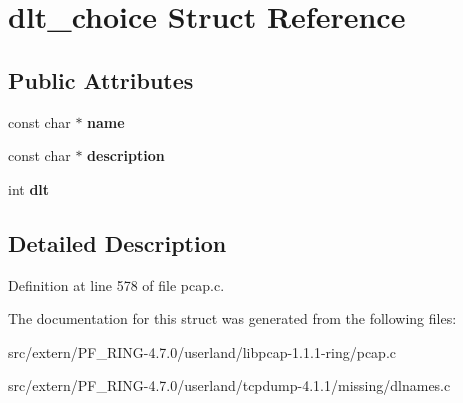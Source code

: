 \hypertarget{structdlt__choice}{
\section{dlt\_\-choice Struct Reference}
\label{structdlt__choice}
}
\subsection*{Public Attributes}
\begin{DoxyCompactItemize}
\item 
\hypertarget{structdlt__choice_a75f87984c116e0fb748b6d6a5bc42f71}{
const char $\ast$ {\bfseries name}}
\label{structdlt__choice_a75f87984c116e0fb748b6d6a5bc42f71}

\item 
\hypertarget{structdlt__choice_a9085ada49708946d805daa09916d1769}{
const char $\ast$ {\bfseries description}}
\label{structdlt__choice_a9085ada49708946d805daa09916d1769}

\item 
\hypertarget{structdlt__choice_a80519859270be7c3f66b88548114b32a}{
int {\bfseries dlt}}
\label{structdlt__choice_a80519859270be7c3f66b88548114b32a}

\end{DoxyCompactItemize}


\subsection{Detailed Description}


Definition at line 578 of file pcap.c.



The documentation for this struct was generated from the following files:\begin{DoxyCompactItemize}
\item 
src/extern/PF\_\-RING-\/4.7.0/userland/libpcap-\/1.1.1-\/ring/pcap.c\item 
src/extern/PF\_\-RING-\/4.7.0/userland/tcpdump-\/4.1.1/missing/dlnames.c\end{DoxyCompactItemize}
